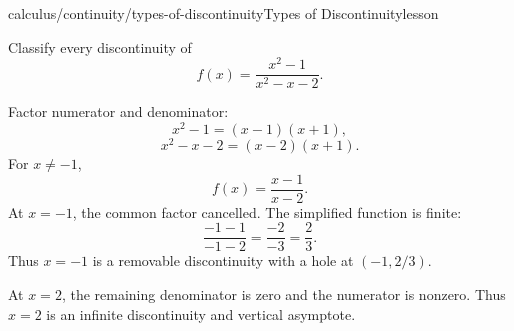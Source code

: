 \begin{webpage}{calculus/continuity/types-of-discontinuity}{Types of Discontinuity}{lesson}
\begin{bgexample}[title={Classify a rational function's discontinuities}]
Classify every discontinuity of
\[
  f(x)=\frac{x^2-1}{x^2-x-2}.
\]

\begin{bgsolution}
Factor numerator and denominator:
\[
  x^2-1=(x-1)(x+1),
\]
\[
  x^2-x-2=(x-2)(x+1).
\]
For \(x\ne-1\),
\[
  f(x)=\frac{x-1}{x-2}.
\]
At \(x=-1\), the common factor cancelled. The simplified function is finite:
\[
  \frac{-1-1}{-1-2}=\frac{-2}{-3}=\frac23.
\]
Thus \(x=-1\) is a removable discontinuity with a hole at \((-1,2/3)\).

At \(x=2\), the remaining denominator is zero and the numerator is nonzero. Thus \(x=2\) is an infinite discontinuity and vertical asymptote.
\end{bgsolution}
\end{bgexample}
\end{webpage}

